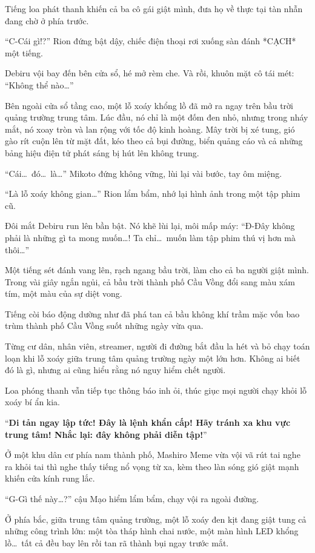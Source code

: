 \documentclass[../main.tex]{subfiles}
\begin{document}
Tiếng loa phát thanh khiến cả ba cô gái giật mình, đưa họ về thực tại tàn nhẫn đang chờ ở phía trước.

``C-Cái gì!?'' Rion đứng bật dậy, chiếc điện thoại rơi xuống sàn đánh *CẠCH* một tiếng.

Debiru vội bay đến bên cửa sổ, hé mở rèm che. Và rồi, khuôn mặt cô tái mét: ``Không thể nào\dots''

Bên ngoài cửa sổ tầng cao, một lỗ xoáy khổng lồ đã mở ra ngay trên bầu trời quảng trường trung tâm. Lúc đầu, nó chỉ là một đốm đen nhỏ, nhưng trong nháy mắt, nó xoay tròn và lan rộng với tốc độ kinh hoàng. Mây trời bị xé tung, gió gào rít cuộn lên từ mặt đất, kéo theo cả bụi đường, biển quảng cáo và cả những bảng hiệu điện tử phát sáng bị hút lên không trung.

``Cái\dots\ đó\dots\ là\dots'' Mikoto đứng không vững, lùi lại vài bước, tay ôm miệng.

``Là lỗ xoáy không gian\dots'' Rion lẩm bẩm, nhớ lại hình ảnh trong một tập phim cũ.

Đôi mắt Debiru run lên bần bật. Nó khẽ lùi lại, môi mấp máy: ``Đ-Đây không phải là những gì ta mong muốn\dots! Ta chỉ\dots\ muốn làm tập phim thú vị hơn mà thôi\dots''

Một tiếng sét đánh vang lên, rạch ngang bầu trời, làm cho cả ba người giật mình. Trong vài giây ngắn ngủi, cả bầu trời thành phố Cầu Vồng đổi sang màu xám tím, một màu của sự diệt vong.

Tiếng còi báo động dường như đã phá tan cả bầu không khí trầm mặc vốn bao trùm thành phố Cầu Vồng suốt những ngày vừa qua.

Từng cư dân, nhân viên, streamer, người đi đường bắt đầu la hét và bỏ chạy toán loạn khi lỗ xoáy giữa trung tâm quảng trường ngày một lớn hơn. Không ai biết đó là gì, nhưng ai cũng hiểu rằng nó nguy hiểm chết người.

Loa phóng thanh vẫn tiếp tục thông báo inh ỏi, thúc giục mọi người chạy khỏi lỗ xoáy bí ẩn kia.

``\textbf{Di tản ngay lập tức! Đây là lệnh khẩn cấp! Hãy tránh xa khu vực trung tâm! Nhắc lại: đây không phải diễn tập!}''

Ở một khu dân cư phía nam thành phố, Mashiro Meme vừa vội vã rút tai nghe ra khỏi tai thì nghe thấy tiếng nổ vọng từ xa, kèm theo làn sóng gió giật mạnh khiến cửa kính rung lắc.

``G-Gì thế này\dots?'' cậu Mạo hiểm lẩm bẩm, chạy vội ra ngoài đường.

Ở phía bắc, giữa trung tâm quảng trường, một lỗ xoáy đen kịt đang giật tung cả những công trình lớn: một tòa tháp hình chai nước, một màn hình LED khổng lồ\dots\ tất cả đều bay lên rồi tan rã thành bụi ngay trước mắt.
\end{document}
